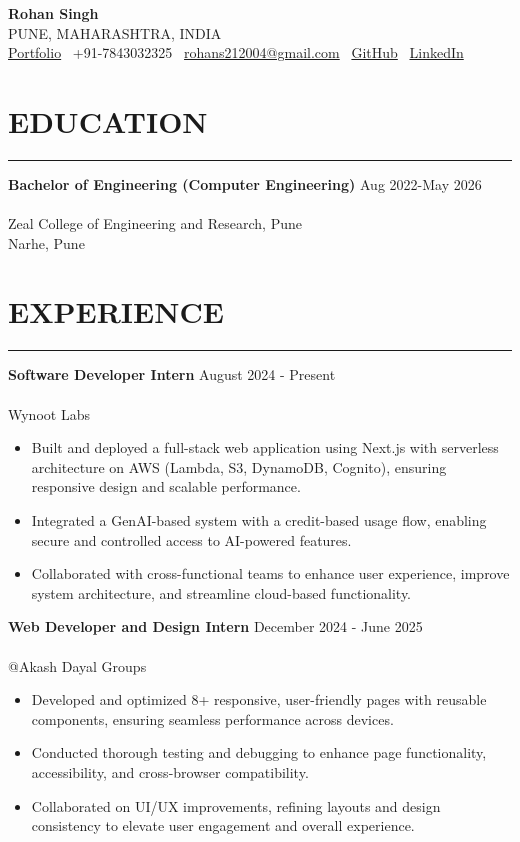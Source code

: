 \documentclass[a4paper,10pt]{article}
\newcommand{\experienceitem}[2]{%
    \noindent\textbf{#1} \hfill #2 \\
    \vspace{-0.9em}
}
\newcommand{\sectionline}[1]{%
    \par\noindent\rule[0.5ex]{\linewidth}{0.5pt}\vspace{-0.3em}%
}
\begin{document}
\begin{center}
\textbf{\Huge Rohan Singh}\\

   
    PUNE, MAHARASHTRA, INDIA \\
    \href{https://rohans21.vercel.app/}{Portfolio} \textbar\ 
    +91-7843032325 \textbar\ 
    \href{mailto:rohans212004@gmail.com}{rohans212004@gmail.com} \textbar\ 
    \href{https://github.com/Rohs21}{GitHub} \textbar\ 
    \href{https://www.linkedin.com/in/rohan-singh-8872322b8/}{LinkedIn}
\end{center}

\vspace{-0.6em}
\section*{EDUCATION}
\sectionline{}
\experienceitem{Bachelor of Engineering (Computer Engineering)}{Aug 2022-May 2026} \\
Zeal College of Engineering and Research, Pune \\
Narhe, Pune

\vspace{-0.1em}
\section*{EXPERIENCE}
\sectionline{}
\experienceitem{Software Developer Intern}{August 2024 - Present} \\
Wynoot Labs
\begin{itemize}[leftmargin=0.5in]
    \item Built and deployed a full-stack web application using Next.js with serverless architecture on AWS (Lambda, S3, DynamoDB, Cognito), ensuring responsive design and scalable performance.
    \item Integrated a GenAI-based system with a credit-based usage flow, enabling secure and controlled access to AI-powered features.
    \item Collaborated with cross-functional teams to enhance user experience, improve system architecture, and streamline cloud-based functionality.
\end{itemize}




\experienceitem{Web Developer and Design Intern}{December 2024 - June 2025} \\
@Akash Dayal Groups
\begin{itemize}[leftmargin=0.5in]
    \item Developed and optimized 8+ responsive, user-friendly pages with reusable components, ensuring seamless performance across devices.
    \item Conducted thorough testing and debugging to enhance page functionality, accessibility, and cross-browser compatibility.
    \item Collaborated on UI/UX improvements, refining layouts and design consistency to elevate user engagement and overall experience.
\end{itemize}
\end{document}
